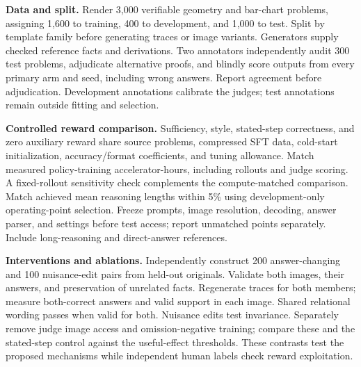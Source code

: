 \documentclass[11pt,letterpaper]{article}
\makeatletter
\renewcommand\section{\@startsection{section}{1}{\z@}{-2ex plus -.5ex minus -.2ex}{1ex plus .2ex}{\normalfont\large\bfseries}}
\makeatother
\begin{document}
\newpage
\section{Experimental Plan}
\textbf{Data and split.} Render 3,000 verifiable geometry and bar-chart problems, assigning 1,600 to training, 400 to development, and 1,000 to test. Split by template family before generating traces or image variants. Generators supply checked reference facts and derivations. Two annotators independently audit 300 test problems, adjudicate alternative proofs, and blindly score outputs from every primary arm and seed, including wrong answers. Report agreement before adjudication. Development annotations calibrate the judges; test annotations remain outside fitting and selection.

\textbf{Controlled reward comparison.} Sufficiency, style, stated-step correctness, and zero auxiliary reward share source problems, compressed SFT data, cold-start initialization, accuracy/format coefficients, and tuning allowance. Match measured policy-training accelerator-hours, including rollouts and judge scoring. A fixed-rollout sensitivity check complements the compute-matched comparison. Match achieved mean reasoning lengths within 5\% using development-only operating-point selection. Freeze prompts, image resolution, decoding, answer parser, and settings before test access; report unmatched points separately. Include long-reasoning and direct-answer references.

\textbf{Interventions and ablations.} Independently construct 200 answer-changing and 100 nuisance-edit pairs from held-out originals. Validate both images, their answers, and preservation of unrelated facts. Regenerate traces for both members; measure both-correct answers and valid support in each image. Shared relational wording passes when valid for both. Nuisance edits test invariance. Separately remove judge image access and omission-negative training; compare these and the stated-step control against the useful-effect thresholds. These contrasts test the proposed mechanisms while independent human labels check reward exploitation.
\end{document}
